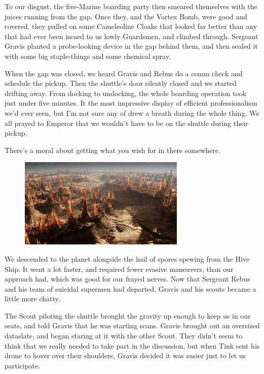 To our disgust, the five-Marine boarding party then smeared themselves with the juices running from the gap. 
Once they, and the Vortex Bomb, were good and covered, they pulled on some Cameleoline Cloaks that looked far better than any that had ever been issued to us lowly Guardsmen, and climbed through. 
Sergeant Gravis planted a probe-looking device in the gap behind them, and then sealed it with some big staple-things and some chemical spray. 


When the gap was closed, we heard Gravis and Rebus do a comm check and schedule the pickup. 
Then the shuttle's door silently closed and we started drifting away. 
From docking to undocking, the whole boarding operation took just under five minutes. 
It the most impressive display of efficient professionalism we'd ever seen, but I'm not sure any of drew a breath during the whole thing. 
We all prayed to Emperor that we wouldn't have to be on the shuttle during their pickup.

There's a moral about getting what you wish for in there somewhere.

\begin{figure}
	\begin{center}
		\includegraphics[width=\figwidth]{pics/12/34.png}
	\end{center}
\end{figure}
We descended to the planet alongside the hail of spores spewing from the Hive Ship. 
It went a lot faster, and required fewer evasive maneuvers, than our approach had, which was good for our frayed nerves. 
Now that Sergeant Rebus and his team of suicidal supermen had departed, Gravis and his scouts became a little more chatty.

The Scout piloting the shuttle brought the gravity up enough to keep us in our seats, and told Gravis that he was starting scans. 
Gravis brought out an oversized dataslate, and began staring at it with the other Scout. 
They didn't seem to think that we really needed to take part in the discussion, but when Tink sent his drone to hover over their shoulders, Gravis decided it was easier just to let us participate.

